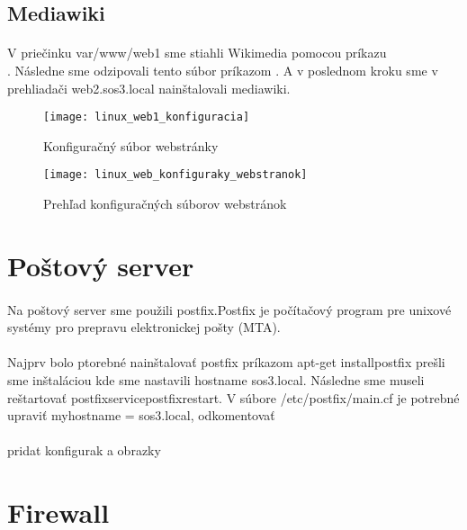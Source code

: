 \subsection{Mediawiki}
\paragraph{}
V priečinku var/www/web1 sme stiahli Wikimedia pomocou príkazu\\  . Následne sme odzipovali tento súbor príkazom  . A v poslednom kroku sme v prehliadači web2.sos3.local nainštalovali mediawiki.

\begin{figure}[!htb]
\centering
\texttt{[image: linux\_web1\_konfiguracia]}
\caption{Konfiguračný súbor webstránky}
\label{fig:x web1_config_file}
\end{figure}

\begin{figure}[!htb]
\centering
\texttt{[image: linux\_web\_konfiguraky\_webstranok]}
\caption{Prehľad konfiguračných súborov webstránok}
\label{fig:x web_config_files_list}
\end{figure}

\section{Poštový server}
\paragraph{}
Na poštový server sme použili postfix.Postfix je počítačový program pre unixové systémy pro prepravu elektronickej pošty (MTA).
\paragraph{}
Najprv bolo ptorebné nainštalovať postfix príkazom apt-get installpostfix prešli sme inštaláciou kde sme nastavili hostname sos3.local. Následne sme museli reštar\-tovať postfixservicepostfixrestart. V súbore /etc/postfix/main.cf je potrebné upraviť myhostname = sos3.local, odkomentovať\\
\paragraph{}
pridat konfigurak a obrazky

\section{Firewall}
